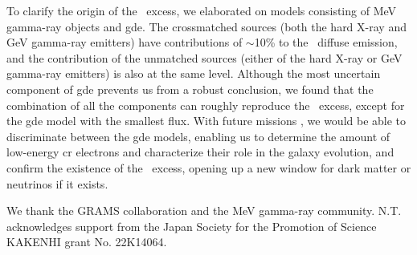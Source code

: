 \documentclass[a4paper,11pt]{article}
\begin{document}
To clarify the origin of the \comptel\ excess, we elaborated on models consisting of MeV gamma-ray objects and \ac{gde}.
The crossmatched sources (both the hard X-ray and GeV gamma-ray emitters) have contributions of $\sim$10\% to the \comptel\ diffuse emission, and the contribution of the unmatched sources  (either of the hard X-ray or GeV gamma-ray emitters) is also at the same level. 
Although the most uncertain component of \ac{gde} prevents us from a robust conclusion, we found that the combination of all the components can roughly reproduce the \comptel\ excess, except for the \ac{gde} model with the smallest flux. 
With future missions \cite{COSI_SMEX,eASTROGAM2018,fleischhack_amego-x_2021,Aramaki2020,takada_first_2022,moiseev_new_2021,lucchetta_introducing_2022}, 
we would be able to discriminate between the \ac{gde} models, enabling us to determine the amount of low-energy \ac{cr} electrons and characterize their role in the galaxy evolution, and confirm the existence of the \comptel\ excess, opening up a new window for dark matter or neutrinos if it exists.
\fi



\acknowledgments
We thank the GRAMS collaboration \cite{Aramaki2020} and the MeV gamma-ray community.
N.T. acknowledges support from the Japan Society for the Promotion of Science KAKENHI grant No. 22K14064.




%
%


%



\end{document}
